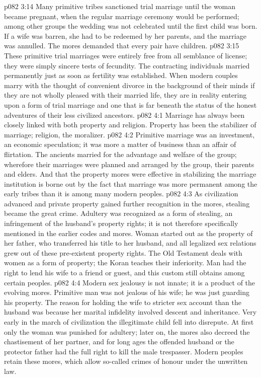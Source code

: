 \vs p082 3:14 Many primitive tribes sanctioned trial marriage until the woman became pregnant, when the regular marriage ceremony would be performed; among other groups the wedding was not celebrated until the first child was born. If a wife was barren, she had to be redeemed by her parents, and the marriage was annulled. The mores demanded that every pair have children.
\vs p082 3:15 These primitive trial marriages were entirely free from all semblance of license; they were simply sincere tests of fecundity. The contracting individuals married permanently just as soon as fertility was established. When modern couples marry with the thought of convenient divorce in the background of their minds if they are not wholly pleased with their married life, they are in reality entering upon a form of trial marriage and one that is far beneath the status of the honest adventures of their less civilized ancestors.
\vs p082 4:1 Marriage has always been closely linked with both property and religion. Property has been the stabilizer of marriage; religion, the moralizer.
\vs p082 4:2 Primitive marriage was an investment, an economic speculation; it was more a matter of business than an affair of flirtation. The ancients married for the advantage and welfare of the group; wherefore their marriages were planned and arranged by the group, their parents and elders. And that the property mores were effective in stabilizing the marriage institution is borne out by the fact that marriage was more permanent among the early tribes than it is among many modern peoples.
\vs p082 4:3 As civilization advanced and private property gained further recognition in the mores, stealing became the great crime. Adultery was recognized as a form of stealing, an infringement of the husband’s property rights; it is not therefore specifically mentioned in the earlier codes and mores. Woman started out as the property of her father, who transferred his title to her husband, and all legalized sex relations grew out of these pre\hyp{}existent property rights. The Old Testament deals with women as a form of property; the Koran teaches their inferiority. Man had the right to lend his wife to a friend or guest, and this custom still obtains among certain peoples.
\vs p082 4:4 Modern sex jealousy is not innate; it is a product of the evolving mores. Primitive man was not jealous of his wife; he was just guarding his property. The reason for holding the wife to stricter sex account than the husband was because her marital infidelity involved descent and inheritance. Very early in the march of civilization the illegitimate child fell into disrepute. At first only the woman was punished for adultery; later on, the mores also decreed the chastisement of her partner, and for long ages the offended husband or the protector father had the full right to kill the male trespasser. Modern peoples retain these mores, which allow so\hyp{}called crimes of honour under the unwritten law.
